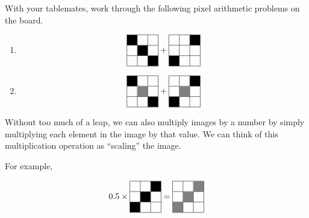 \begin{prob}
With your tablemates, work through the following pixel arithmetic problems on the board.
\begin{enumerate}
\item
\begin{align}
\begin{tabular}{|c|c|c|}
\hline
\cellcolor{black}& & \\
\hline
& \cellcolor{black} & \\
\hline
& & \cellcolor{black} \\
\hline
\end{tabular} + \begin{tabular}{|c|c|c|}
\hline
 & &\cellcolor{black} \\
\hline
& & \\
\hline
 \cellcolor{black} & & \\
\hline
\end{tabular}\nonumber
\end{align}

\item

\begin{align}
\begin{tabular}{|c|c|c|}
\hline
\cellcolor{black}& & \\
\hline
& \cellcolor{gray} & \\
\hline
& & \cellcolor{black} \\
\hline
\end{tabular} + \begin{tabular}{|c|c|c|}
\hline
 & &\cellcolor{black} \\
\hline
& \cellcolor{gray} & \\
\hline
 \cellcolor{black} & & \\
\hline
\end{tabular}\nonumber
\end{align}
\end{enumerate}
\end{prob}

Without too much of a leap, we can also multiply images by a number by simply multiplying each element in the image by that value.  We can think of this multiplication operation as ``scaling'' the image.

For example, 

\begin{align}
0.5 \times \begin{tabular}{|c|c|c|}
\hline
& &\cellcolor{black} \\
\hline
& \cellcolor{black} & \\
\hline
 \cellcolor{black}& & \\
\hline
\end{tabular} = \begin{tabular}{|c|c|c|}
\hline
 & &\cellcolor{gray} \\
\hline
& \cellcolor{gray} & \\
\hline
 \cellcolor{gray} & & \\
\hline
\end{tabular}\nonumber
\end{align}

